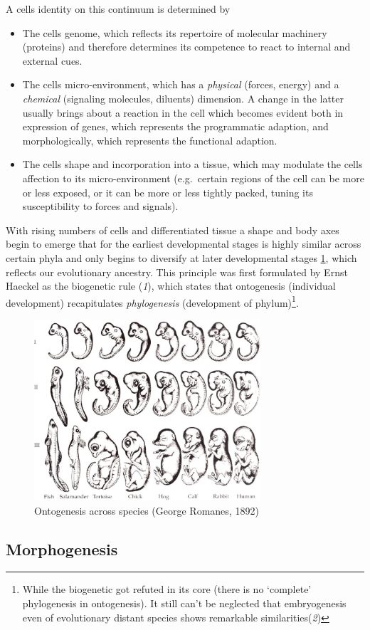 \documentclass[11pt,singlespacinge,twoside]{reedthesis} %
\providecommand{\tightlist}{%
  \setlength{\itemsep}{0pt}\setlength{\parskip}{0pt}}
\begin{document}
A cells identity on this continuum is determined by
\begin{itemize}
\tightlist
\item
  The cells genome, which reflects its repertoire of molecular machinery (proteins) and therefore determines its competence to react to internal and external cues.
\item
  The cells micro-environment, which has a \emph{physical} (forces, energy) and a \emph{chemical} (signaling molecules, diluents) dimension. A change in the latter usually brings about a reaction in the cell which becomes evident both in expression of genes, which represents the programmatic adaption, and morphologically, which represents the functional adaption.
\item
  The cells shape and incorporation into a tissue, which may modulate the cells affection to its micro-environment (e.g.~certain regions of the cell can be more or less exposed, or it can be more or less tightly packed, tuning its susceptibility to forces and signals).
\end{itemize}
With rising numbers of cells and differentiated tissue a shape and body axes begin to emerge that for the earliest developmental stages is highly similar across certain phyla and only begins to diversify at later developmental stages \ref{fig:heak}, which reflects our evolutionary ancestry. This principle was first formulated by Ernst Haeckel as the biogenetic rule (\emph{1}), which states that ontogenesis (individual development) recapitulates \emph{phylogenesis} (development of phylum)\footnote{While the biogenetic got refuted in its core (there is no `complete' phylogenesis in ontogenesis). It still can't be neglected that embryogenesis even of evolutionary distant species shows remarkable similarities(\emph{2})}.
\begin{figure}

{\centering \includegraphics[width=0.75\textwidth]{figures/intro/haekel} 

}

\caption{Ontogenesis across species (George Romanes, 1892)}\label{fig:heak}
\end{figure}
\hypertarget{morphogenesis}{%
\subsection{Morphogenesis}\label{morphogenesis}}
\end{document}
